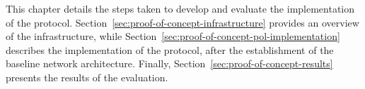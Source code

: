 This chapter details the steps taken to develop and evaluate the \poc{} implementation of the \pol{} protocol. Section~\ref{sec:proof-of-concept-infrastructure} provides an overview of the infrastructure, while Section~\ref{sec:proof-of-concept-pol-implementation} describes the implementation of the \pol{} protocol, after the establishment of the baseline network architecture. Finally, Section~\ref{sec:proof-of-concept-results} presents the results of the \poc{} evaluation.